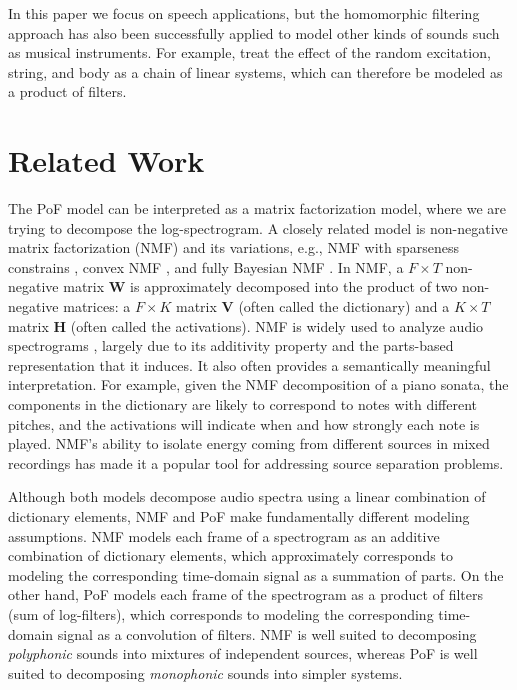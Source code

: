 \documentclass{article} %
\begin{document}
In this paper we focus on speech applications, but the homomorphic filtering approach has also been successfully applied to model other
kinds of sounds such as musical instruments. For example,  \cite{karjalainen1993towards}  treat the effect of the random excitation, string, and body as a chain of linear systems, which can therefore be modeled as a product of filters. 


\section{Related Work}
The PoF model can be interpreted as a matrix factorization model,
where we are trying to decompose the log-spectrogram. A closely
related model is non-negative matrix factorization (NMF)
\cite{seung2001algorithms} and its variations, e.g., NMF with
sparseness constrains \cite{hoyer2004non}, convex NMF
\cite{ding2010convex}, and fully Bayesian NMF
\cite{cemgil2009bayesian}. In NMF, a $F \times T$ non-negative matrix
$\mathbf{W}$ is approximately decomposed into the product of two
non-negative matrices: a $F\times K$ matrix $\mathbf{V}$ (often called
the dictionary) and a $K \times T$ matrix $\mathbf{H}$ (often called
the activations).  NMF is widely used to analyze audio
spectrograms \cite{neco09, smaragdis2003non}, largely due to its
additivity property and the parts-based representation that it
induces. It also often provides a semantically meaningful
interpretation. For example, given the NMF decomposition of a piano
sonata, the components in the dictionary are likely to correspond to
notes with different pitches, and the activations will indicate when
and how strongly each note is played. NMF's ability to isolate energy
coming from different sources in mixed recordings has made it a
popular tool for addressing source separation problems.

Although both models decompose audio spectra using a linear
combination of dictionary elements, NMF and PoF make fundamentally
different modeling assumptions. NMF models each frame of a
spectrogram as an additive combination of dictionary elements, which
approximately corresponds to modeling the corresponding time-domain
signal as a summation of parts. On the other hand, PoF models each
 frame of the spectrogram as a product of filters (sum of
log-filters), which corresponds to modeling the corresponding
time-domain signal as a convolution of filters. NMF is well suited to
decomposing \emph{polyphonic} sounds into mixtures of independent
sources, whereas PoF is well suited to decomposing \emph{monophonic}
sounds into simpler systems.
\end{document}
